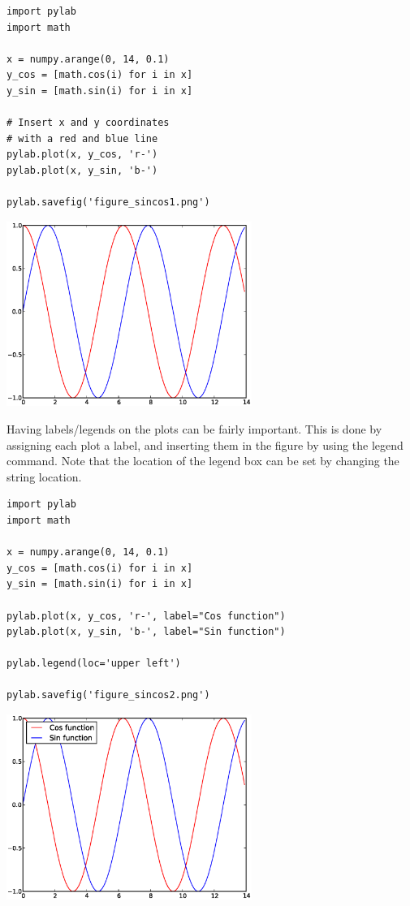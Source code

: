 \documentclass{article}
\begin{document}
\begin{multicols}{2}

\begin{lstlisting}
import pylab
import math

x = numpy.arange(0, 14, 0.1)
y_cos = [math.cos(i) for i in x]
y_sin = [math.sin(i) for i in x]

# Insert x and y coordinates
# with a red and blue line
pylab.plot(x, y_cos, 'r-')
pylab.plot(x, y_sin, 'b-')

pylab.savefig('figure_sincos1.png')

\end{lstlisting}
\columnbreak
\includegraphics[width=0.6\textwidth]{py/figure_sincos1.eps}
\end{multicols}

Having labels/legends on the plots can be fairly important. This
is done by assigning each plot a label, and inserting them in the figure by using the legend
command.
Note that the location of the legend box can be set by changing the string location.


\begin{multicols}{2}

\begin{lstlisting}
import pylab
import math

x = numpy.arange(0, 14, 0.1)
y_cos = [math.cos(i) for i in x]
y_sin = [math.sin(i) for i in x]

pylab.plot(x, y_cos, 'r-', label="Cos function")
pylab.plot(x, y_sin, 'b-', label="Sin function")

pylab.legend(loc='upper left')

pylab.savefig('figure_sincos2.png')

\end{lstlisting}
\columnbreak
\includegraphics[width=0.6\textwidth]{py/figure_sincos2.eps}
\end{multicols}
\end{document}
